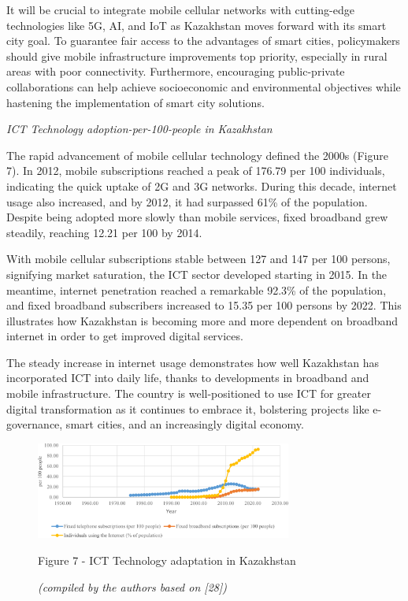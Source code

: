 \begin{multicols}{2}
It will be crucial to integrate mobile cellular networks with
cutting-edge technologies like 5G, AI, and IoT as Kazakhstan moves
forward with its smart city goal. To guarantee fair access to the
advantages of smart cities, policymakers should give mobile
infrastructure improvements top priority, especially in rural areas with
poor connectivity. Furthermore, encouraging public-private
collaborations can help achieve socioeconomic and environmental
objectives while hastening the implementation of smart city solutions.

\emph{ICT Technology adoption-per-100-people in Kazakhstan}

The rapid advancement of mobile cellular technology defined the 2000s
(Figure 7). In 2012, mobile subscriptions reached a peak of 176.79 per
100 individuals, indicating the quick uptake of 2G and 3G networks.
During this decade, internet usage also increased, and by 2012, it had
surpassed 61\% of the population. Despite being adopted more slowly than
mobile services, fixed broadband grew steadily, reaching 12.21 per 100
by 2014.

With mobile cellular subscriptions stable between 127 and 147 per 100
persons, signifying market saturation, the ICT sector developed starting
in 2015. In the meantime, internet penetration reached a remarkable
92.3\% of the population, and fixed broadband subscribers increased to
15.35 per 100 persons by 2022. This illustrates how Kazakhstan is
becoming more and more dependent on broadband internet in order to get
improved digital services.

The steady increase in internet usage demonstrates how well Kazakhstan
has incorporated ICT into daily life, thanks to developments in
broadband and mobile infrastructure. The country is well-positioned to
use ICT for greater digital transformation as it continues to embrace
it, bolstering projects like e-governance, smart cities, and an
increasingly digital economy.
\end{multicols}

\begin{figure}[H]
	\centering
	\includegraphics[width=0.75\textwidth]{media/ekon/Graph_18}
	\caption*{Figure 7 - ICT Technology adaptation in Kazakhstan}
	\caption*{\normalfont \emph{(compiled by the authors based on {[}28{]})}}
\end{figure}

